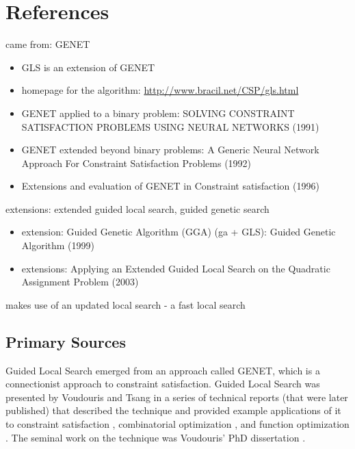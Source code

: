 \documentclass[a4paper, 11pt]{article}
\begin{document}
\section{References}
\label{sec:references}

came from: GENET
\begin{itemize}
	\item GLS is an extension of GENET
	\item homepage for the algorithm: \url{http://www.bracil.net/CSP/gls.html}
	\item GENET applied to a binary problem: SOLVING CONSTRAINT SATISFACTION PROBLEMS USING NEURAL NETWORKS (1991)
	\item GENET extended beyond binary problems: A Generic Neural Network Approach For Constraint Satisfaction Problems (1992)
	\item Extensions and evaluation of GENET in Constraint satisfaction (1996)
\end{itemize}


extensions: extended guided local search, guided genetic search
\begin{itemize}
	\item extension: Guided Genetic Algorithm (GGA) (ga + GLS): Guided Genetic Algorithm (1999)
	\item extensions: Applying an Extended Guided Local Search on the Quadratic Assignment Problem (2003)
\end{itemize}


makes use of an updated local search - a fast local search


% 
% 
\subsection{Primary Sources}
Guided Local Search emerged from an approach called GENET, which is a connectionist approach to constraint satisfaction.
Guided Local Search was presented by Voudouris and Tsang in a series of technical reports (that were later published) that described the technique and provided example applications of it to constraint satisfaction \cite{Voudouris1994}, combinatorial optimization \cite{Voudouris1995b, Voudouris1995}, and function optimization \cite{Voudouris1995a}.
The seminal work on the technique was Voudouris' PhD dissertation \cite{Voudouris1997}.
\end{document}
